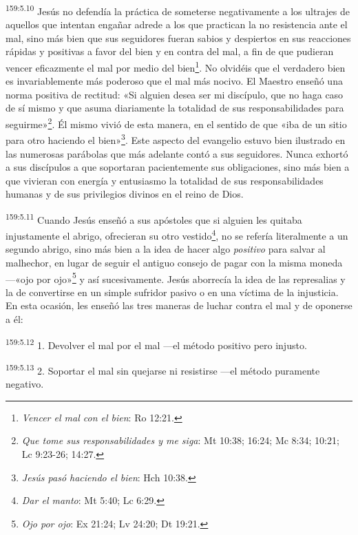 \par
\textsuperscript{159:5.10} Jesús no defendía la práctica de someterse negativamente a los ultrajes de aquellos que intentan engañar adrede a los que practican la no resistencia ante el mal, sino más bien que sus seguidores fueran sabios y despiertos en sus reacciones rápidas y positivas a favor del bien y en contra del mal, a fin de que pudieran vencer eficazmente el mal por medio del bien\footnote{\textit{Vencer el mal con el bien}: Ro 12:21.}. No olvidéis que el verdadero bien es invariablemente más poderoso que el mal más nocivo. El Maestro enseñó una norma positiva de rectitud: «Si alguien desea ser mi discípulo, que no haga caso de sí mismo y que asuma diariamente la totalidad de sus responsabilidades para seguirme»\footnote{\textit{Que tome sus responsabilidades y me siga}: Mt 10:38; 16:24; Mc 8:34; 10:21; Lc 9:23-26; 14:27.}. Él mismo vivió de esta manera, en el sentido de que «iba de un sitio para otro haciendo el bien»\footnote{\textit{Jesús pasó haciendo el bien}: Hch 10:38.}. Este aspecto del evangelio estuvo bien ilustrado en las numerosas parábolas que más adelante contó a sus seguidores. Nunca exhortó a sus discípulos a que soportaran pacientemente sus obligaciones, sino más bien a que vivieran con energía y entusiasmo la totalidad de sus responsabilidades humanas y de sus privilegios divinos en el reino de Dios.

\par
\textsuperscript{159:5.11} Cuando Jesús enseñó a sus apóstoles que si alguien les quitaba injustamente el abrigo, ofrecieran su otro vestido\footnote{\textit{Dar el manto}: Mt 5:40; Lc 6:29.}, no se refería literalmente a un segundo abrigo, sino más bien a la idea de hacer algo \textit{positivo} para salvar al malhechor, en lugar de seguir el antiguo consejo de pagar con la misma moneda ---«ojo por ojo»\footnote{\textit{Ojo por ojo}: Ex 21:24; Lv 24:20; Dt 19:21.} y así sucesivamente. Jesús aborrecía la idea de las represalias y la de convertirse en un simple sufridor pasivo o en una víctima de la injusticia. En esta ocasión, les enseñó las tres maneras de luchar contra el mal y de oponerse a él:

\par
\textsuperscript{159:5.12} 1. Devolver el mal por el mal ---el método positivo pero injusto.

\par
\textsuperscript{159:5.13} 2. Soportar el mal sin quejarse ni resistirse ---el método puramente negativo.


